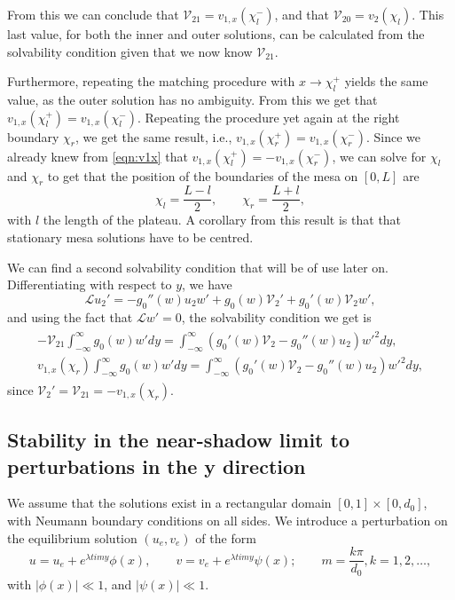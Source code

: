 \documentclass[a4paper,10pt]{article}
\newcommand{\lA}{\ensuremath{\lambda}}
\newcommand{\VV}{\ensuremath{\mathcal{V}}}
\newcommand{\LL}{\ensuremath{\mathcal{L}}}
\begin{document}
From this we can conclude that $\VV_{21} = v_{1,x}(\chi_l^-)$, and that $\VV_{20} = v_2(\chi_l)$. This last value, for both the inner and outer solutions, can be calculated from the solvability condition given that we now know $\VV_{21}$. 

Furthermore, repeating the matching procedure with $x\rightarrow \chi_l^+$ yields the same value, as the outer solution has no ambiguity. From this we get that $v_{1,x}(\chi_l^+) = v_{1,x}(\chi_l^-)$. Repeating the procedure yet again at the right boundary $\chi_r$, we get the same result, i.e., $v_{1,x}(\chi_r^+) = v_{1,x}(\chi_r^-)$. Since we already knew from \eqref{eqn:v1x} that $v_{1,x}(\chi_l^+) = - v_{1,x}(\chi_r^-)$, we can solve for $\chi_l$ and $\chi_r$ to get that the position of the boundaries of the mesa on $[0,L]$ are
% 
$$
  \chi_l = \frac{L-l}{2}, \qquad \chi_r = \frac{L+l}{2},
$$
% 
with $l$ the length of the plateau. A corollary from this result is that that stationary mesa solutions have to be centred.

We can find a second solvability condition that will be of use later on. Differentiating with respect to $y$, we have
% 
\begin{equation}
  \LL u_2' = -g_0''(w)u_2w' + g_0(w)\VV_2' + g_0'(w)\VV_2w',
\end{equation}
% 
and using the fact that $\LL w'=0$, the solvability condition we get is
% 
\begin{equation}
\label{eqn:solva1}
\begin{split}
\begin{aligned}
  -\VV_{21}\int_{-\infty}^{\infty}g_0(w)w'dy = \int_{-\infty}^{\infty}(g_0'(w)\VV_2 - g_0''(w)u_2)w'^2dy,\\
  v_{1,x}(\chi_r)\int_{-\infty}^{\infty}g_0(w)w'dy = \int_{-\infty}^{\infty}(g_0'(w)\VV_2 - g_0''(w)u_2)w'^2dy,
\end{aligned}
\end{split}
\end{equation}
% 
since $\VV_2' = \VV_{21} = -v_{1,x}(\chi_r)$.


\subsection{\label{section:stability}Stability in the near-shadow limit to perturbations in the y direction}

We assume that the solutions exist in a rectangular domain $[0,1]\times[0,d_0]$, with Neumann boundary conditions on all sides. We introduce a perturbation on the equilibrium solution $(u_e,v_e)$ of the form
% 
\begin{equation}
  u = u_e + e^{\lA timy}\phi(x),\qquad v = v_e + e^{\lA timy}\psi(x); \qquad m = \frac{k\pi}{d_0},k=1,2,\ldots,
\end{equation}
%
with $|\phi(x)|\ll1$, and $|\psi(x)|\ll1$.
\end{document}
